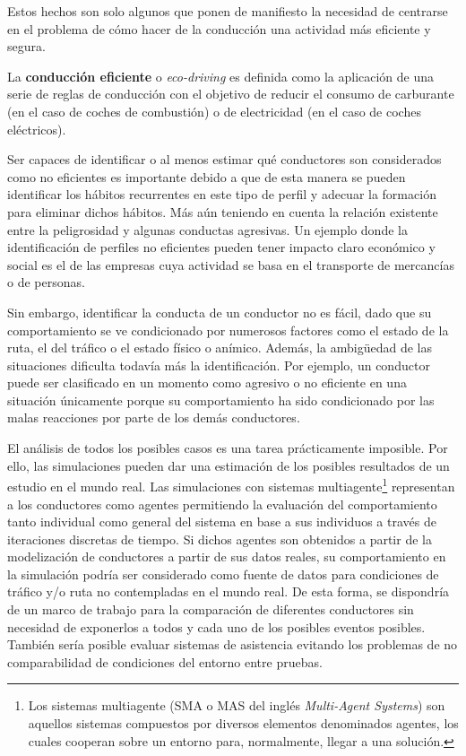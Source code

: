 Estos hechos son solo algunos que ponen de manifiesto la necesidad de centrarse en el problema de cómo hacer de la conducción una actividad más eficiente y segura.

La \textbf{conducción eficiente} o \textit{eco-driving} es definida como la aplicación de una serie de reglas de conducción con el objetivo de reducir el consumo de carburante (en el caso de coches de combustión) o de electricidad (en el caso de coches eléctricos).

Ser capaces de identificar o al menos estimar qué conductores son considerados como no eficientes es importante debido a que de esta manera se pueden identificar los hábitos recurrentes en este tipo de perfil y adecuar la formación para eliminar dichos hábitos. Más aún teniendo en cuenta la relación existente entre la peligrosidad y algunas conductas agresivas. Un ejemplo donde la identificación de perfiles no eficientes pueden tener impacto claro económico y social es el de las empresas cuya actividad se basa en el transporte de mercancías o de personas.

Sin embargo, identificar la conducta de un conductor no es fácil, dado que su comportamiento se ve condicionado por numerosos factores como el estado de la ruta, el del tráfico o el estado físico o anímico. Además, la ambigüedad de las situaciones dificulta todavía más la identificación. Por ejemplo, un conductor puede ser clasificado en un momento como agresivo o no eficiente en una situación únicamente porque su comportamiento ha sido condicionado por las malas reacciones por parte de los demás conductores.

El análisis de todos los posibles casos es una tarea prácticamente imposible. Por ello, las simulaciones pueden dar una estimación de los posibles resultados de un estudio en el mundo real. Las simulaciones con sistemas multiagente\footnote{Los sistemas multiagente (SMA o MAS del inglés \textit{Multi-Agent Systems}) son aquellos sistemas compuestos por diversos elementos denominados agentes, los cuales cooperan sobre un entorno para, normalmente, llegar a una solución.} representan a los conductores como agentes permitiendo la evaluación del comportamiento tanto individual como general del sistema en base a sus individuos a través de iteraciones discretas de tiempo. Si dichos agentes son obtenidos a partir de la modelización de conductores a partir de sus datos reales, su comportamiento en la simulación podría ser considerado como fuente de datos para condiciones de tráfico y/o ruta no contempladas en el mundo real. De esta forma, se dispondría de un marco de trabajo para la comparación de diferentes conductores sin necesidad de exponerlos a todos y cada uno de los posibles eventos posibles. También sería posible evaluar sistemas de asistencia evitando los problemas de no comparabilidad de condiciones del entorno entre pruebas.


